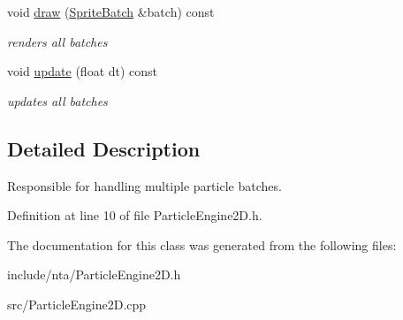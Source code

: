 \begin{DoxyCompactItemize}
void \hyperlink{classnta_1_1ParticleEngine2D_a759937cf45e74162ce85269ddf59237b}{draw} (\hyperlink{classnta_1_1SpriteBatch}{Sprite\+Batch} \&batch) const
\begin{DoxyCompactList}\small\item\em renders all batches \end{DoxyCompactList}\item 
\mbox{\label{classnta_1_1ParticleEngine2D_ad9c7f1be65505d86c23f5754e5fd9430}} 
void \hyperlink{classnta_1_1ParticleEngine2D_ad9c7f1be65505d86c23f5754e5fd9430}{update} (float dt) const
\begin{DoxyCompactList}\small\item\em updates all batches \end{DoxyCompactList}\end{DoxyCompactItemize}


\subsection{Detailed Description}
Responsible for handling multiple particle batches. 

Definition at line 10 of file Particle\+Engine2\+D.\+h.



The documentation for this class was generated from the following files\+:\begin{DoxyCompactItemize}
\item 
include/nta/Particle\+Engine2\+D.\+h\item 
src/Particle\+Engine2\+D.\+cpp\end{DoxyCompactItemize}
